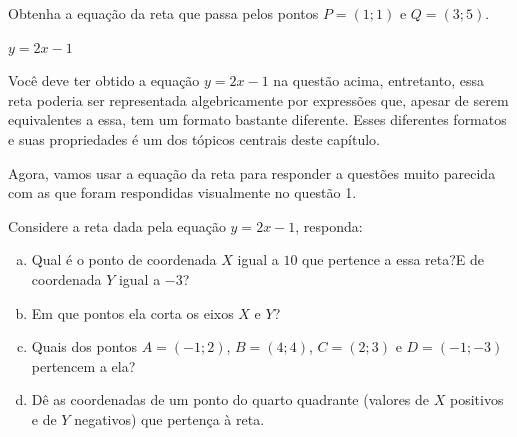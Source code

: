 \documentclass[main.tex]{subfiles}
\begin{document}
\begin{questao}
Obtenha a equação da reta que passa pelos pontos $P=(1;1)$ e $Q=(3;5)$.
\end{questao}


\begin{gabarito}
	\begin{gabaritoQuestao}
		$y=2x-1$
	\end{gabaritoQuestao}
\end{gabarito}

Você deve ter obtido a equação $y=2x-1$ na questão acima, entretanto, essa reta poderia ser representada algebricamente por expressões que, apesar de serem equivalentes a essa, tem um formato bastante diferente. Esses diferentes formatos e suas propriedades é um dos tópicos centrais deste capítulo.

Agora, vamos usar a equação da reta para responder a questões muito parecida com as que foram respondidas visualmente no questão 1.

\begin{questao}
Considere a reta dada pela equação $y=2x-1$, responda:
\begin{enumerate}[a)]
\item Qual é o ponto de coordenada $X$ igual a $10$ que pertence a essa reta?E de coordenada $Y$ igual a $-3$?
\item Em que pontos ela corta os eixos $X$ e $Y$?
\item Quais dos pontos $A=(-1;2)$, $B=(4;4)$, $C=(2;3)$ e $D=(-1;-3)$ pertencem a ela? 
\item Dê as coordenadas de um ponto do quarto quadrante (valores de $X$ positivos e de $Y$ negativos) que pertença à reta.
\end{enumerate} 
\end{questao}

\end{document}
